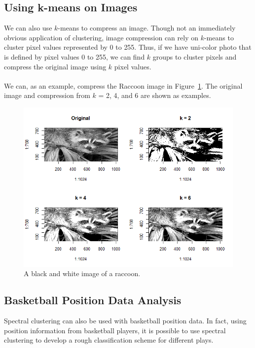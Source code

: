 \documentclass[12pt]{article}
\theoremstyle{plain}
\begin{document}
\subsection{Using k-means on Images}
We can also use $ k $-means to compress an image. Though not an immediately obvious application of clustering, image compression can rely on $ k $-means to cluster pixel values represented by 0 to 255. Thus, if we have uni-color photo that is defined by pixel values 0 to 255, we can find $ k $ groups to cluster pixels and compress the original image using $ k $ pixel values.
\\ \\
We can, as an example, compress the Raccoon image in Figure~\ref{fig:raccoon}. The original image and compression from $ k $ = 2, 4, and 6 are shown as examples.
\begin{figure}[H]
  \captionsetup{width=0.8\textwidth}
  \centering
  \includegraphics[width=\textwidth]{raccoon}
  \caption{
      A black and white image of a raccoon.
  }
  \label{fig:raccoon}
\end{figure}



\subsection{Basketball Position Data Analysis}

Spectral clustering can also be used with basketball position data.
In fact, using position information from basketball players, it is possible to use spectral clustering to develop a rough classification scheme for different plays.


{}

\end{document}
